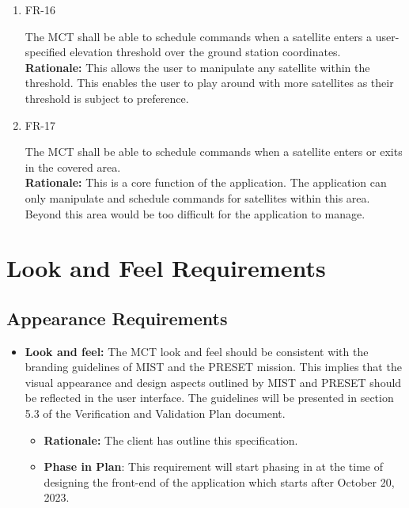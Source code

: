 \documentclass[12pt]{article}
\begin{document}
\begin{enumerate}
    \item{FR-16\\}

    The MCT shall be able to schedule commands when a satellite enters a user-specified elevation threshold over the ground station coordinates. \\
    \textbf{Rationale:} This allows the user to manipulate any satellite within the threshold. This enables the user to play around with more satellites as their threshold is subject to preference. 

    \item{FR-17\\}
    
    The MCT shall be able to schedule commands when a satellite enters or exits in the covered area. \\
    \textbf{Rationale:} This is a core function of the application. The application can only manipulate and schedule commands for satellites within this area. Beyond this area would be too difficult for the application to manage. 

\end{enumerate}

\section{Look and Feel Requirements}
\subsection{Appearance Requirements}

\begin{itemize}
    \item \textbf{Look and feel:} The MCT look and feel should be consistent with the branding guidelines of MIST and the PRESET mission. This implies that the visual appearance and design aspects outlined by MIST and PRESET should be reflected in the user interface. The guidelines will be presented in section 5.3 of the Verification and Validation Plan document.
    \begin{itemize}
        \item \textbf{Rationale: }The client has outline this specification.
        \item \textbf{Phase in Plan}: This requirement will start phasing in at the time of designing the front-end of the application which starts after October 20, 2023.
    \end{itemize}
\end{itemize}
\end{document}
